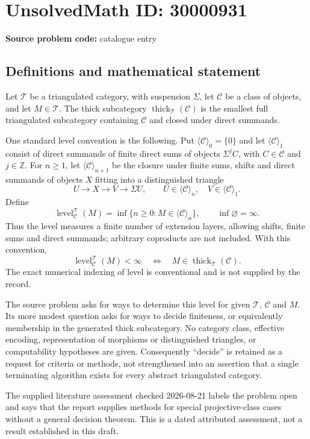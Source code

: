 \documentclass[11pt]{article}
\newcommand{\Z}{\mathbb{Z}}
\begin{document}
\section*{UnsolvedMath ID: 30000931}
\textbf{Source problem code:} catalogue entry
\subsection{Definitions and mathematical statement}
Let $\mathcal T$ be a triangulated category, with suspension $\Sigma$, let $\mathcal C$ be a class of objects, and let $M\in\mathcal T$. The thick subcategory $\operatorname{thick}_{\mathcal T}(\mathcal C)$ is the smallest full triangulated subcategory containing $\mathcal C$ and closed under direct summands.

One standard level convention is the following. Put $\langle\mathcal C\rangle_0=\{0\}$ and let $\langle\mathcal C\rangle_1$ consist of direct summands of finite direct sums of objects $\Sigma^j C$, with $C\in\mathcal C$ and $j\in\Z$. For $n\geq1$, let $\langle\mathcal C\rangle_{n+1}$ be the closure under finite sums, shifts and direct summands of objects $X$ fitting into a distinguished triangle
\[
U\longrightarrow X\longrightarrow V\longrightarrow\Sigma U,
\qquad U\in\langle\mathcal C\rangle_n,\quad V\in\langle\mathcal C\rangle_1.
\]
Define
\[
\operatorname{level}_{\mathcal C}^{\mathcal T}(M)
=\inf\{n\geq0:M\in\langle\mathcal C\rangle_n\},\qquad
\inf\varnothing=\infty.
\]
Thus the level measures a finite number of extension layers, allowing shifts, finite sums and direct summands; arbitrary coproducts are not included. With this convention,
\[
\operatorname{level}_{\mathcal C}^{\mathcal T}(M)<\infty
\quad\Longleftrightarrow\quad
M\in\operatorname{thick}_{\mathcal T}(\mathcal C).
\]
The exact numerical indexing of level is conventional and is not supplied by the record.

The source problem asks for ways to determine this level for given $\mathcal T$, $\mathcal C$ and $M$. Its more modest question asks for ways to decide finiteness, or equivalently membership in the generated thick subcategory. No category class, effective encoding, representation of morphisms or distinguished triangles, or computability hypotheses are given. Consequently ``decide'' is retained as a request for criteria or methods, not strengthened into an assertion that a single terminating algorithm exists for every abstract triangulated category.

The supplied literature assessment checked 2026-08-21 labels the problem open and says that the report supplies methods for special projective-class cases without a general decision theorem. This is a dated attributed assessment, not a result established in this draft.
\end{document}
